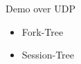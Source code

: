 \documentclass[aspectratio=169]{beamer}
\begin{document}
\begin{frame}[c]{Demo over UDP}
\begin{itemize}
\item Fork-Tree
\item Session-Tree
\end{itemize}

\end{frame}

\end{document}
